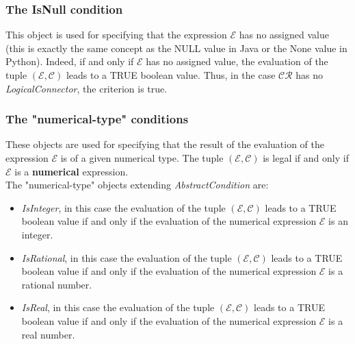 \documentclass[a4paper,11pt] {ivoa}
\begin{document}
\subsubsection{The IsNull condition}\label{par-IsNull}
This object is used for specifying that the expression $\mathcal E$ has no assigned value (this is
exactly the same concept as the NULL value in Java or the None value in Python).
Indeed, if and only if $\mathcal E$ has no assigned value, the evaluation of the tuple $(\mathcal
E, \mathcal C)$ leads to a TRUE boolean value. Thus, in the case $\mathcal{CR}$ has no {\it
LogicalConnector}, the criterion is true.

\subsubsection{The "numerical-type" conditions}
These objects are used for specifying that the result of the evaluation of the expression $\mathcal
E$ is of a given numerical type. The tuple $(\mathcal E, \mathcal C)$ is legal if and only if
$\mathcal E$ is a {\bf numerical} expression. \\
The "numerical-type" objects extending {\it AbstractCondition}  are:
\begin{itemize}
\item {\it IsInteger}, in this case the evaluation of the tuple $(\mathcal E, \mathcal C)$ leads to
a TRUE boolean value if and only if the evaluation of the numerical expression $\mathcal E$ is an
integer.
\item {\it IsRational}, in this case the evaluation of the tuple $(\mathcal E, \mathcal C)$ leads
to a TRUE boolean value if and only if the evaluation of the numerical expression $\mathcal E$ is a
rational number.
\item {\it IsReal}, in this case the evaluation of the tuple $(\mathcal E, \mathcal C)$ leads to a
TRUE boolean value
if and only if the evaluation of the numerical expression $\mathcal E$ is a real number.
\end{itemize} 
\end{document}
